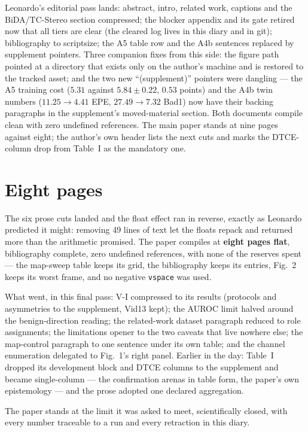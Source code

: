 \documentclass[11pt,a4paper]{article}
\begin{document}
Leonardo's editorial pass lands: abstract, intro, related work, captions and
the BiDA/TC-Stereo section compressed; the blocker appendix and its gate
retired now that all tiers are clear (the cleared log lives in this diary and
in git); bibliography to scriptsize; the A5 table row and the A4b sentences
replaced by supplement pointers. Three companion fixes from this side: the
figure path pointed at a directory that exists only on the author's machine
and is restored to the tracked asset; and the two new ``(supplement)''
pointers were dangling --- the A5 training cost ($5.31$ against
$5.84\pm0.22$, $0.53$ points) and the A4b twin numbers ($11.25 \to 4.41$ EPE,
$27.49 \to 7.32$ Bad1) now have their backing paragraphs in the supplement's
moved-material section. Both documents compile clean with zero undefined
references. The main paper stands at nine pages against eight; the author's
own header lists the next cuts and marks the DTCE-column drop from Table~I as
the mandatory one.



\section*{Eight pages}

The six prose cuts landed and the float effect ran in reverse, exactly as
Leonardo predicted it might: removing 49 lines of text let the floats repack
and returned more than the arithmetic promised. The paper compiles at
\textbf{eight pages flat}, bibliography complete, zero undefined references,
with none of the reserves spent --- the map-sweep table keeps its grid, the
bibliography keeps its entries, Fig.~2 keeps its worst frame, and no
negative \texttt{vspace} was used.

What went, in this final pass: V-I compressed to its results (protocols and
asymmetries to the supplement, Vid13 kept); the AUROC limit halved around
the benign-direction reading; the related-work dataset paragraph reduced to
role assignments; the limitations opener to the two caveats that live
nowhere else; the map-control paragraph to one sentence under its own table;
and the channel enumeration delegated to Fig.~1's right panel. Earlier in
the day: Table~I dropped its development block and DTCE columns to the
supplement and became single-column --- the confirmation arenas in table
form, the paper's own epistemology --- and the prose adopted one declared
aggregation.

The paper stands at the limit it was asked to meet, scientifically closed,
with every number traceable to a run and every retraction in this diary.
\end{document}
